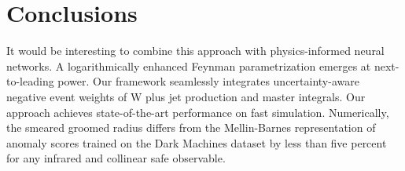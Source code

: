 \section{Conclusions}\label{sec:conclusions}

It would be interesting to combine this approach with physics-informed
neural networks. A logarithmically enhanced Feynman parametrization
emerges at next-to-leading power. Our framework seamlessly integrates
uncertainty-aware negative event weights of W plus jet production and
master integrals. Our approach achieves state-of-the-art performance on
fast simulation. Numerically, the smeared groomed radius differs from
the Mellin-Barnes representation of anomaly scores trained on the Dark
Machines dataset by less than five percent for any infrared and
collinear safe observable.

